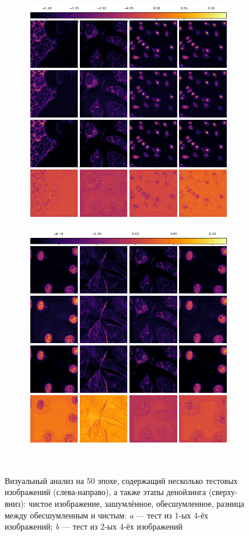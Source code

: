 \begin{figure}[H]
	\begin{subfigure}[t]{\dimexpr.5\linewidth-1.3em\relax}
		\centering
		\includegraphics[width=.65\linewidth,valign=t]{my_folder/images/denoising/fix_test_epoch_50.png}
	\end{subfigure}
	\hfill %
	\begin{subfigure}[t]{\dimexpr.5\linewidth-1.3em\relax}
		\centering
		\includegraphics[width=.65\linewidth,valign=t]{my_folder/images/denoising/fix_test2_epoch_50.png}
	\end{subfigure}
	\\[20pt]
	\captionsetup{justification=centering} %
	\caption{Визуальный анализ на 50 эпохе, содержащий несколько тестовых изображений (слева-направо), а также этапы денойзинга (сверху-вниз): чистое изображение, зашумлённое, обесшумленное, разница между обесшумленным и чистым: {\itshape a} --- тест из 1-ых 4-ёх изображений; {\itshape b} --- тест из 2-ых 4-ёх изображений} 
	\label{fig:train-iters}
\end{figure}

